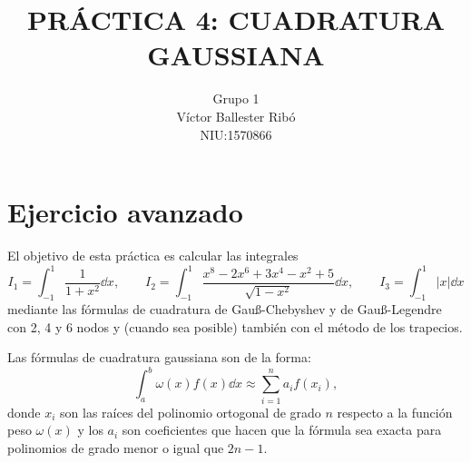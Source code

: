 \documentclass[a4paper]{article}
\title{\bfseries\Large PRÁCTICA 4: CUADRATURA GAUSSIANA}
\author{Grupo 1\\Víctor Ballester Ribó\\NIU:1570866}
\date{\parbox{\linewidth}{\centering
  Métodos numéricos\endgraf
  Grado en Matemáticas\endgraf
  Universitat Autònoma de Barcelona\endgraf
  4 de Junio de 2021}}
\begin{document}
\maketitle
\thispagestyle{empty}
\newpage
\setcounter{page}{1}
\restoregeometry
\section{Ejercicio avanzado}\label{ejercicioavanzado}
El objetivo de esta práctica es calcular las integrales
$$I_1=\int_{-1}^1\frac{1}{1+x^2}\dd x,\qquad I_2=\int_{-1}^1\frac{x^8-2x^6+3x^4-x^2+5}{\sqrt{1-x^2}}\dd x,\qquad I_3=\int_{-1}^1|x|\dd x$$ mediante las fórmulas de cuadratura de Gau\ss-Chebyshev y de Gau\ss-Legendre con 2, 4 y 6 nodos y (cuando sea posible) también con el método de los trapecios.\par 
Las fórmulas de cuadratura gaussiana son de la forma: 
\begin{equation}
    \int_a^b\omega(x)f(x)\dd x\approx\sum_{i=1}^na_if(x_i),
    \label{gauss}
\end{equation}
donde $x_i$ son las raíces del polinomio ortogonal de grado $n$ respecto a la función peso $\omega(x)$ y los $a_i$ son coeficientes que hacen que la fórmula sea exacta para polinomios de grado menor o igual que $2n-1$.
\end{document}
